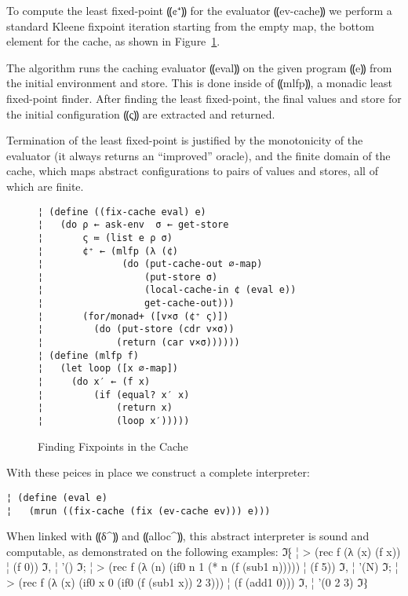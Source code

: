 To compute the least fixed-point ⸨¢⁺⸩ for the evaluator ⸨ev-cache⸩ we perform a
standard Kleene fixpoint iteration starting from the empty map, the bottom
element for the cache, as shown in Figure~\ref{f:fixing}.

The algorithm runs the caching evaluator ⸨eval⸩ on the given program ⸨e⸩ from
the initial environment and store. This is done inside of ⸨mlfp⸩, a monadic
least fixed-point finder. After finding the least fixed-point, the final values
and store for the initial configuration ⸨ς⸩ are extracted and returned.

Termination of the least fixed-point is justified by the monotonicity of the
evaluator (it always returns an “improved” oracle), and the finite domain of
the cache, which maps abstract configurations to pairs of values and stores,
all of which are finite.

\begin{figure} %
\begin{lstlisting}
¦ (define ((fix-cache eval) e)  
¦   (do ρ ← ask-env  σ ← get-store
¦       ς ≔ (list e ρ σ)
¦       ¢⁺ ← (mlfp (λ (¢) 
¦              (do (put-cache-out ∅-map)
¦                  (put-store σ)
¦                  (local-cache-in ¢ (eval e))
¦                  get-cache-out)))
¦       (for/monad+ ([v×σ (¢⁺ ς)])
¦         (do (put-store (cdr v×σ))
¦             (return (car v×σ))))))
¦ (define (mlfp f)
¦   (let loop ([x ∅-map])
¦     (do x′ ← (f x)
¦         (if (equal? x′ x)
¦             (return x)
¦             (loop x′)))))
\end{lstlisting}
\caption{Finding Fixpoints in the Cache}
\label{f:fixing}
\end{figure} %

With these peices in place we construct a complete interpreter:
\begin{lstlisting}
¦ (define (eval e)
¦   (mrun ((fix-cache (fix (ev-cache ev))) e)))
\end{lstlisting}
When linked with ⸨δ^⸩ and ⸨alloc^⸩, this abstract interpreter is sound and
computable, as demonstrated on the following examples:
ℑ⁅
¦ > (rec f (λ (x) (f x))
¦     (f 0))
ℑ,
¦ '()
ℑ;
¦ > (rec f (λ (n) (if0 n 1 (* n (f (sub1 n)))))
¦     (f 5))
ℑ,
¦ '(N)
ℑ;
¦ > (rec f (λ (x) (if0 x 0 (if0 (f (sub1 x)) 2 3)))
¦      (f (add1 0)))
ℑ,
¦ '(0 2 3)
ℑ⁆
